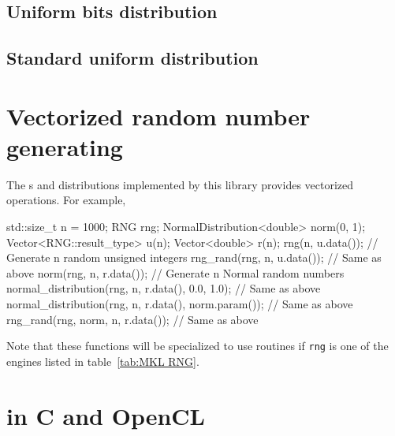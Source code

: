\subsection{Uniform bits distribution}
\label{sub:Uniform bits distribution}

\subsection{Standard uniform distribution}
\label{sub:Standard uniform distribution}

\section{Vectorized random number generating}
\label{sec:Vectorized random number generating}

The \rng{}s and distributions implemented by this library provides vectorized
operations. For example,
\begin{cppcode}
  std::size_t n = 1000;
  RNG rng;
  NormalDistribution<double> norm(0, 1);
  Vector<RNG::result_type> u(n);
  Vector<double> r(n);
  rng(n, u.data());           // Generate n random unsigned integers
  rng_rand(rng, n, u.data()); // Same as above
  norm(rng, n, r.data());     // Generate n Normal random numbers
  normal_distribution(rng, n, r.data(), 0.0, 1.0);     // Same as above
  normal_distribution(rng, n, r.data(), norm.param()); // Same as above
  rng_rand(rng, norm, n, r.data());                    // Same as above
\end{cppcode}
Note that these functions will be specialized to use \mkl routines if
\verb|rng| is one of the engines listed in table~\ref{tab:MKL RNG}.

\section{\protect\rng in C and OpenCL}
\label{sec:RNG in C and OpenCL}


